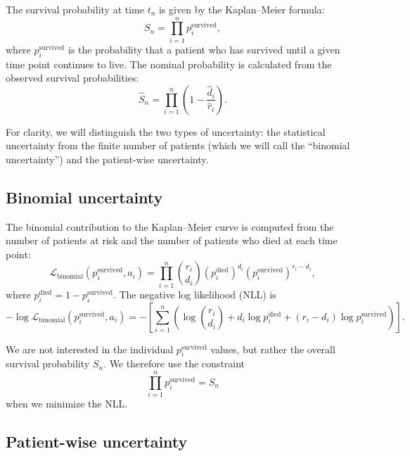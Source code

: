 \documentclass[article]{jss}
\newcommand{\KM}{Kaplan--Meier} %
\begin{document}
The survival probability at time \(t_n\) is given by the \KM{} formula:
\begin{equation}
S_n = \prod_{i=1}^{n} p_i^\text{survived}, \label{eq:km-survival}
\end{equation}
where \(p_i^\text{survived}\) is the probability that a patient who has survived until a given time point continues to live.  The nominal probability is calculated from the observed survival probabilities:
\begin{equation}
\hat{S}_n = \prod_{i=1}^{n} \left(1 - \frac{\hat{d}_i}{\hat{r}_i}\right). \label{eq:km-nominal}
\end{equation}

For clarity, we will distinguish the two types of uncertainty: the statistical uncertainty from the finite number of patients (which we will call the ``binomial uncertainty'') and the patient-wise uncertainty.

\subsection{Binomial uncertainty}\label{sec:binomial-uncertainty}

The binomial contribution to the \KM{} curve is computed from the number of patients at risk and the number of patients who died at each time point:
\begin{equation}
\mathcal{L}_{\text{binomial}}(p_i^\text{survived}, a_i) = \prod_{i=1}^{n} \binom{r_i}{d_i} {\left(p_i^\text{died}\right)}^{d_i} {\left(p_i^\text{survived}\right)}^{r_i-d_i},
\end{equation}
where \(p_i^\text{died} = 1 - p_i^\text{survived}\).  The negative log likelihood (NLL) is
\begin{equation}
-\log \mathcal{L}_{\text{binomial}}(p_i^\text{survived}, a_i) = -\left[\sum_{i=1}^{n} \left( \log\binom{r_i}{d_i} + d_i \log p_i^\text{died} + (r_i-d_i) \log p_i^\text{survived} \right)\right]. \label{eq:binomial-nll}
\end{equation}

We are not interested in the individual \(p_i^\text{survived}\) values, but rather the overall survival probability \(S_n\).  We therefore use the constraint
\begin{equation}
\prod_{i=1}^{n} p_i^\text{survived} = S_n \label{eq:km-probability-constraint}
\end{equation}
when we minimize the NLL\@.

\subsection{Patient-wise uncertainty}\label{sec:patient-wise-uncertainty}
\end{document}
